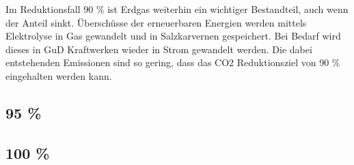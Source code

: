 Im Reduktionsfall 90 \% ist Erdgas weiterhin ein wichtiger Bestandteil, auch wenn der Anteil sinkt. Überschüsse der erneuerbaren Energien werden mittels Elektrolyse in Gas gewandelt und in Salzkarvernen gespeichert. Bei Bedarf wird dieses in GuD Kraftwerken wieder in Strom gewandelt werden. Die dabei entstehenden Emissionen sind so gering, dass das CO2 Reduktionsziel von 90 \% eingehalten werden kann. 

\subsection{95 \%}

\subsection{100 \%}
%
